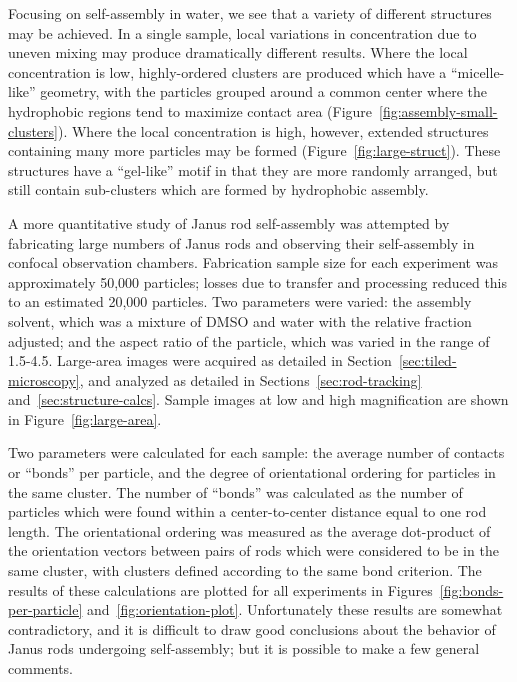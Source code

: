 
Focusing on self-assembly in water, we see that a variety of different structures may be 
achieved.  In a single sample, local variations in concentration due to uneven mixing may produce
dramatically different results.  Where the local concentration is low, highly-ordered clusters 
are produced which have a ``micelle-like'' geometry, with the particles grouped around a common 
center where the hydrophobic regions tend to maximize contact area 
(Figure~\ref{fig:assembly-small-clusters}).  Where the local concentration
is high, however, extended structures containing many more particles may be formed
(Figure~\ref{fig:large-struct}).  These
structures have a ``gel-like'' motif in that they are more randomly arranged, but still contain
sub-clusters which are formed by hydrophobic assembly.





A more quantitative study of Janus rod self-assembly was attempted by fabricating large 
numbers of Janus rods and observing their self-assembly in confocal observation chambers.
Fabrication sample size for each experiment was approximately 50,000 particles; losses
due to transfer and processing reduced this to an estimated 20,000 particles.
Two parameters were varied: the assembly solvent, which was a mixture of DMSO and water
with the relative fraction adjusted; and the aspect ratio of the particle, which was varied
in the range of 1.5-4.5.  Large-area images were acquired as detailed in 
Section~\ref{sec:tiled-microscopy}, and analyzed as detailed in Sections~\ref{sec:rod-tracking}
and~\ref{sec:structure-calcs}.  Sample images at low and high magnification are shown
in Figure~\ref{fig:large-area}.

Two parameters were calculated for each sample: the average number of contacts or ``bonds''
per particle, and the degree of orientational ordering for particles in the same cluster.
The number of ``bonds'' was calculated as the number of particles which were found within a 
center-to-center distance equal to one rod length.  The orientational ordering was measured
as the average dot-product of the orientation vectors between pairs of rods which were 
considered to be in the same cluster, with clusters defined according to the same bond criterion.
The results of these calculations are plotted for all experiments in Figures~\ref{fig:bonds-per-particle}
and~\ref{fig:orientation-plot}.  Unfortunately these results are somewhat contradictory, and it 
is difficult to draw good conclusions about the behavior of Janus rods undergoing self-assembly;
but it is possible to make a few general comments.

